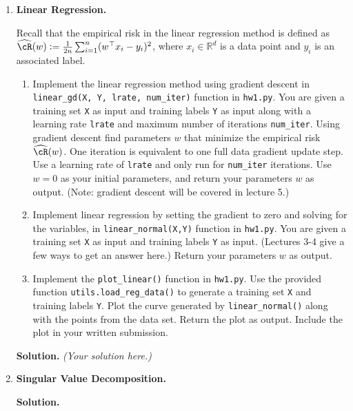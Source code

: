 \documentclass{article}
\def\R{\mathbb{R}}
\def\hcR{\widehat{\cR}}
\theoremstyle{definition}
\theoremstyle{remark}
\newenvironment{Q}
        {%
          \clearpage
          \item
        }
        {%
          \phantom{s} %
          \bigskip
          \textbf{Solution.}
        }
\begin{document}
\begin{enumerate}
          \begin{Q}
          \textbf{Linear Regression.}

          Recall that the empirical risk in the linear regression method is defined as $\hcR(w) := \frac{1}{2n}\sum_{i=1}^n (w^\top x_i - y_i)^2$, where $x_i \in \R^d$ is a data point and $y_i$ is an associated label.
          \begin{enumerate}
            \item Implement the linear regression method using gradient descent in \texttt{linear\_gd(X, Y, lrate, num\_iter)} function in \texttt{hw1.py}. You are given a training set \texttt{X} as input and training labels \texttt{Y} as input along with a learning rate \texttt{lrate} and maximum number of iterations \texttt{num\_iter}.  Using gradient descent find parameters $w$ that minimize the empirical risk $\hcR(w)$.  One iteration is equivalent to one full data gradient update step. Use a learning rate of \texttt{lrate} and only run for \texttt{num\_iter} iterations. Use $w = 0$ as your initial parameters, and return your parameters $w$ as output.  (Note: gradient descent will be covered in lecture 5.)
            \item Implement linear regression by setting the gradient to zero and solving for the variables, in \texttt{linear\_normal(X,Y)} function in \texttt{hw1.py}. You are given a training set \texttt{X} as input and training labels \texttt{Y} as input.  (Lectures 3-4 give a few ways to get an answer here.) Return your parameters $w$ as output.
          \item Implement the \texttt{plot\_linear()} function in \texttt{hw1.py}.  Use the provided function \texttt{utils.load\_reg\_data()} to generate a training set \texttt{X} and training labels \texttt{Y}. Plot the curve generated by \texttt{linear\_normal()} along with the points from the data set.  Return the plot as output.  Include the plot in your written submission.
          \end{enumerate}
          \end{Q}
          \emph{(Your solution here.)}


          \begin{Q}
          \textbf{Singular Value Decomposition.}


\end{Q}
\end{enumerate}
\end{document}
